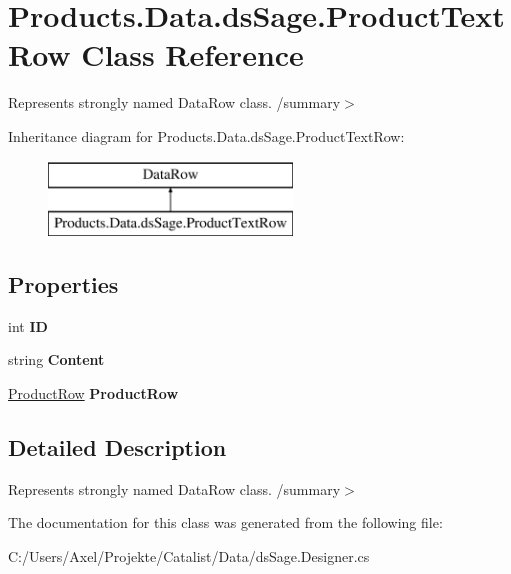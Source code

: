 \hypertarget{class_products_1_1_data_1_1ds_sage_1_1_product_text_row}{}\section{Products.\+Data.\+ds\+Sage.\+Product\+Text\+Row Class Reference}
\label{class_products_1_1_data_1_1ds_sage_1_1_product_text_row}


Represents strongly named Data\+Row class. /summary$>$  


Inheritance diagram for Products.\+Data.\+ds\+Sage.\+Product\+Text\+Row\+:\begin{figure}[H]
\begin{center}
\leavevmode
\includegraphics[height=2.000000cm]{class_products_1_1_data_1_1ds_sage_1_1_product_text_row}
\end{center}
\end{figure}
\subsection*{Properties}
\begin{DoxyCompactItemize}
\item 
int {\bfseries ID}\hypertarget{class_products_1_1_data_1_1ds_sage_1_1_product_text_row_a5fc4e629851fadf54a5297fea74a4c61}{}\label{class_products_1_1_data_1_1ds_sage_1_1_product_text_row_a5fc4e629851fadf54a5297fea74a4c61}

\item 
string {\bfseries Content}\hypertarget{class_products_1_1_data_1_1ds_sage_1_1_product_text_row_ac6f42599a6253d81ba1bd619e7ae71f1}{}\label{class_products_1_1_data_1_1ds_sage_1_1_product_text_row_ac6f42599a6253d81ba1bd619e7ae71f1}

\item 
\hyperlink{class_products_1_1_data_1_1ds_sage_1_1_product_row}{Product\+Row} {\bfseries Product\+Row}\hypertarget{class_products_1_1_data_1_1ds_sage_1_1_product_text_row_ac39b634aabd958f59e673620b3ea82fe}{}\label{class_products_1_1_data_1_1ds_sage_1_1_product_text_row_ac39b634aabd958f59e673620b3ea82fe}

\end{DoxyCompactItemize}


\subsection{Detailed Description}
Represents strongly named Data\+Row class. /summary$>$ 

The documentation for this class was generated from the following file\+:\begin{DoxyCompactItemize}
\item 
C\+:/\+Users/\+Axel/\+Projekte/\+Catalist/\+Data/ds\+Sage.\+Designer.\+cs\end{DoxyCompactItemize}
